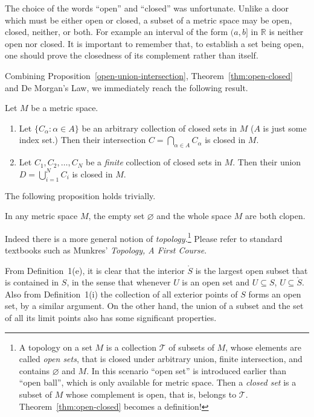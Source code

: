 The choice of the words ``open'' and ``closed'' was unfortunate.
Unlike a door which must be either open or closed, a subset of a metric space may be open, closed, neither, or both.
For example an interval of the form $(a,b]$ in $\mathbb{R}$ is neither open nor closed.
It is important to remember that, to establish a set being open, one should prove the closedness of its complement rather than itself.

Combining Proposition~\ref{open-union-intersection}, Theorem~\ref{thm:open-closed} and De Morgan's Law, we immediately reach the following result.

\begin{prop}
  \label{closed-union-intersection}
  Let $M$ be a metric space.
  \begin{enumerate}[$(a)$]
    \item Let $\{ C_\alpha \colon \alpha \in A \}$ be an arbitrary collection of closed sets in $M$ ($A$ is just some index set.)
      Then their intersection $C = \displaystyle \bigcap_{\alpha \in A} C_\alpha$ is closed in $M$.

    \item Let $C_1, C_2, \dots, C_N$ be a {\em finite} collection of closed sets in $M$.
      Then their union $D = \displaystyle \bigcup_{i=1}^N C_i$ is closed in $M$.
  \end{enumerate}
\end{prop}

The following proposition holds trivially.

\begin{prop}
  \label{empty-universal-clopen}
  In any metric space $M$, the empty set $\varnothing$ and the whole space $M$ are both clopen.
\end{prop}

Indeed there is a more general notion of {\em topology.}\footnote{A \textsf{topology} on a set $M$ is a collection $\mathcal T$ of subsets of $M$, whose elements are called {\em open sets}, that is closed under arbitrary union, finite intersection, and contains $\varnothing$ and $M$.  In this scenario ``open set'' is introduced earlier than ``open ball'', which is only available for metric space.  Then a {\em closed set} is a subset of $M$ whose complement is open, that is, belongs to $\mathcal T$.  Theorem~\ref{thm:open-closed} becomes a definition!}
Please refer to standard textbooks such as Munkres' {\em Topology, A First Course}.

From Definition~1(e), it is clear that the interior $\mathring{S}$ is the largest open subset that is contained in $S$, in the sense that whenever $U$ is an open set and $U \subseteq S$, $U \subseteq \mathring{S}$.
Also from Definition~1(i) the collection of all exterior points of $S$ forms an open set, by a similar argument. 
On the other hand, the union of a subset and the set of all its limit points also has some significant properties.

